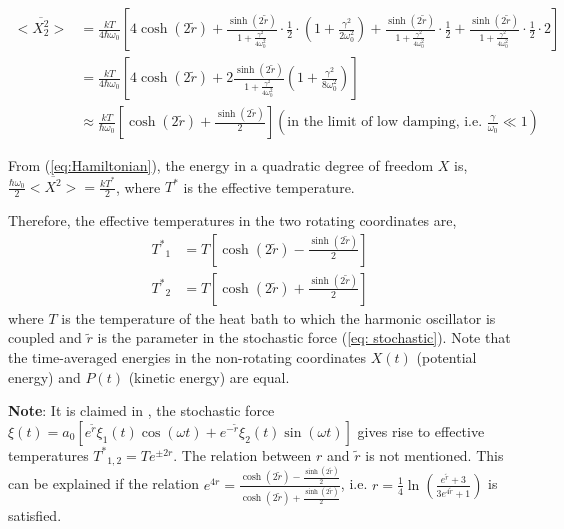\documentclass[12pt, twoside]{article}
\begin{document}
 $\begin{aligned}
 <\overline { X _ { 2 } ^ { 2 } } > &= \frac{kT}{4\hbar\omega_0}\left[4\cosh(2\tilde{r}) + \frac{\sinh(2\tilde{r})}{1+\frac{\gamma^2}{4\omega_0^2}}\cdot\frac{1}{2}\cdot\left(1+\frac{\gamma^2}{2\omega_0^2}\right) + \frac{\sinh(2\tilde{r})}{1+\frac{\gamma^2}{4\omega_0^2}}\cdot\frac{1}{2} + \frac{\sinh(2\tilde{r})}{1+\frac{\gamma^2}{4\omega_0^2}}\cdot\frac{1}{2}\cdot2 \right]
 \\ & = \frac{kT}{4\hbar\omega_0}\left[4\cosh(2\tilde{r}) + 2\frac{\sinh(2\tilde{r})}{1+\frac{\gamma^2}{4\omega_0^2}}\left(1+\frac{\gamma^2}{8\omega_0^2}\right) \right]
 \\ & \approx \frac{kT}{\hbar\omega_0}\left[\cosh(2\tilde{r}) + \frac{\sinh(2\tilde{r})}{2}\right] \left(\text{in the limit of low damping, i.e. } \frac{\gamma}{\omega_0} \ll 1\right)
 \end{aligned}$
 
 From (\ref{eq:Hamiltonian}), the energy in a quadratic degree of freedom $X$ is,  $\frac{\hbar\omega_0}{2} <\overline { X ^ { 2 } } > = \frac{kT^*}{2}$, where $T^*$ is the effective temperature.
 
 Therefore, the effective temperatures in the two rotating coordinates are,
 \begin{equation}\label{eq:eff_temp}
 \begin{aligned}
 {T^*}_1 &= T \left[\cosh(2\tilde{r}) - \frac{\sinh(2\tilde{r})}{2}\right]
 \\ {T^*}_2 &= T \left[\cosh(2\tilde{r}) + \frac{\sinh(2\tilde{r})}{2}\right]
 \end{aligned}
 \end{equation}
 where $T$ is the temperature of the heat bath to which the harmonic oscillator is coupled and $\tilde{r}$ is the parameter in the stochastic force (\ref{eq: stochastic}). Note that the time-averaged energies in the non-rotating coordinates $X(t)$ (potential energy) and $P(t)$ (kinetic energy) are equal.
 
 \textbf{Note}: It is claimed in \cite{klaers}, the stochastic force $\xi(t) =  a_0 [e^{\tilde{r}} \xi_1(t) \cos(\omega t) + e^{-{\tilde{r}}} \xi_2(t)\sin(\omega t)]$ gives rise to effective temperatures ${T^*}_{1,2}
= T e^{\pm 2r}$. The relation between $r$ and $\tilde{r}$ is not mentioned. This can be explained if the relation $e^{4r} = \frac{\cosh(2\tilde{r}) - \frac{\sinh(2\tilde{r})}{2}}{\cosh(2\tilde{r}) + \frac{\sinh(2\tilde{r})}{2}}$, i.e. $r = \frac{1}{4}\ln(\frac{e^{\tilde{r}} + 3}{3 e^{4\tilde{r}} + 1})$ is satisfied.
\end{document}
